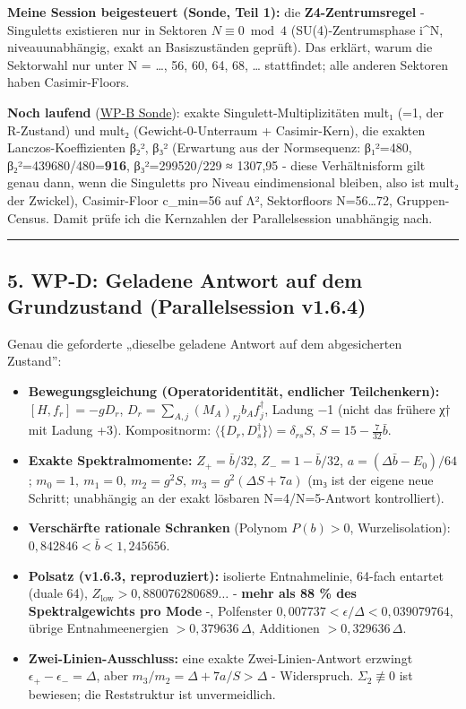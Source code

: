 \textbf{Meine Session beigesteuert (Sonde, Teil 1):} die
\textbf{Z4-Zentrumsregel} - Singuletts existieren nur in Sektoren
\(N\equiv 0 \bmod 4\) (SU(4)-Zentrumsphase i\^{}N, niveauunabhängig,
exakt an Basiszuständen geprüft). Das erklärt, warum die Sektorwahl nur
unter N = \ldots, 56, 60, 64, 68, \ldots{} stattfindet; alle anderen
Sektoren haben Casimir-Floors.

\textbf{Noch laufend} (\href{aa1ce128-e016-4c52-ae8f-04d625b04c23}{WP-B
Sonde}): exakte Singulett-Multiplizitäten mult₁ (=1, der R-Zustand) und
mult₂ (Gewicht-0-Unterraum + Casimir-Kern), die exakten
Lanczos-Koeffizienten β₂², β₃² (Erwartung aus der Normsequenz: β₁²=480,
β₂²=439680/480=\textbf{916}, β₃²=299520/229 ≈ 1307,95 - diese
Verhältnisform gilt genau dann, wenn die Singuletts pro Niveau
eindimensional bleiben, also ist mult₂ der Zwickel), Casimir-Floor
c\_min=56 auf Λ², Sektorfloors N=56\ldots72, Gruppen-Census. Damit prüfe
ich die Kernzahlen der Parallelsession unabhängig nach.

\begin{center}\rule{0.5\linewidth}{0.5pt}\end{center}

\subsection{5. WP-D: Geladene Antwort auf dem Grundzustand
(Parallelsession
v1.6.4)}\label{wp-d-geladene-antwort-auf-dem-grundzustand-parallelsession-v1.6.4}

Genau die geforderte „dieselbe geladene Antwort auf dem abgesicherten
Zustand'':

\begin{itemize}
\tightlist
\item
  \textbf{Bewegungsgleichung (Operatoridentität, endlicher
  Teilchenkern):} \([H,f_r]=-gD_r\),
  \(D_r=\sum_{A,j}(M_A)_{rj}b_Af_j^\dagger\), Ladung −1 (nicht das
  frühere χ† mit Ladung +3). Kompositnorm:
  \(\langle\{D_r,D_s^\dagger\}\rangle=\delta_{rs}S\),
  \(S=15-\tfrac{7}{32}\bar b\).
\item
  \textbf{Exakte Spektralmomente:} \(Z_+=\bar b/32\),
  \(Z_-=1-\bar b/32\), \(a=(\Delta\bar b-E_0)/64\);
  \(m_0=1,\ m_1=0,\ m_2=g^2S,\ m_3=g^2(\Delta S+7a)\) (m₃ ist der eigene
  neue Schritt; unabhängig an der exakt lösbaren N=4/N=5-Antwort
  kontrolliert).
\item
  \textbf{Verschärfte rationale Schranken} (Polynom \(P(b)>0\),
  Wurzelisolation): \(0{,}842846<\bar b<1{,}245656\).
\item
  \textbf{Polsatz (v1.6.3, reproduziert):} isolierte Entnahmelinie,
  64-fach entartet (duale 64), \(Z_{\text{low}}>0{,}880076280689\ldots\)
  - \textbf{mehr als 88 \% des Spektralgewichts pro Mode} -, Polfenster
  \(0{,}007737<\epsilon/\Delta<0{,}039079764\), übrige Entnahmeenergien
  \(>0{,}379636\,\Delta\), Additionen \(>0{,}329636\,\Delta\).
\item
  \textbf{Zwei-Linien-Ausschluss:} eine exakte Zwei-Linien-Antwort
  erzwingt \(\epsilon_+-\epsilon_-=\Delta\), aber
  \(m_3/m_2=\Delta+7a/S>\Delta\) - Widerspruch. \(\Sigma_2\not\equiv0\)
  ist bewiesen; die Reststruktur ist unvermeidlich.
\end{itemize}

